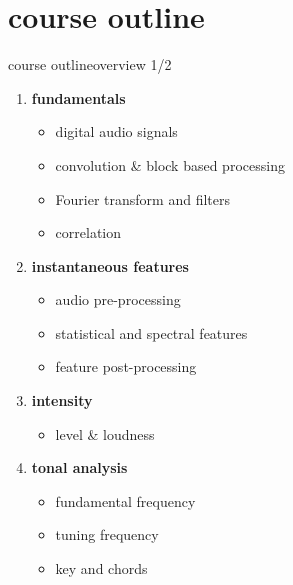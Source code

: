     \section{course outline}
        \begin{frame}{course outline}{overview 1/2}
            \begin{enumerate}
                \item	\textbf{fundamentals}
                        \begin{itemize}
                            \item	digital audio signals
                            \item	convolution \& block based processing
                            \item	Fourier transform and filters
                            \item	correlation
                        \end{itemize}
                \smallskip
                \item<2->	\textbf{instantaneous features}
                        \begin{itemize}
                            \item	audio pre-processing
                            \item	statistical and spectral features
                            \item	feature post-processing
                        \end{itemize}
                \smallskip
                \item<3->	\textbf{intensity}
                        \begin{itemize}
                            \item	level \& loudness
                        \end{itemize}
                \smallskip
                \item<4->	\textbf{tonal analysis}
                        \begin{itemize}
                            \item	fundamental frequency
                            \item	tuning frequency
                            \item	key and chords
                        \end{itemize}
            \setcounter{iDistance}{\value{enumi}}
            \end{enumerate}
        \end{frame}
